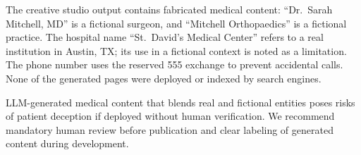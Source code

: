 \documentclass[conference]{IEEEtran}
\begin{document}
The creative studio output contains fabricated medical content: ``Dr.~Sarah Mitchell, MD'' is a fictional surgeon, and ``Mitchell Orthopaedics'' is a fictional practice. The hospital name ``St.~David's Medical Center'' refers to a real institution in Austin, TX; its use in a fictional context is noted as a limitation. The phone number uses the reserved 555 exchange to prevent accidental calls. None of the generated pages were deployed or indexed by search engines.

LLM-generated medical content that blends real and fictional entities poses risks of patient deception if deployed without human verification. We recommend mandatory human review before publication and clear labeling of generated content during development.



\end{document}
